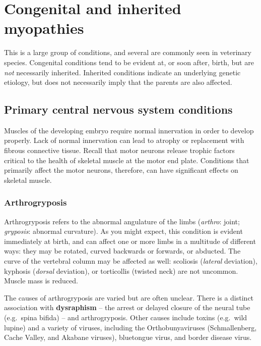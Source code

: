 \documentclass[openany]{book}
\begin{document}
\chapter{Congenital and inherited
myopathies}\label{congenital-and-inherited-myopathies}

This is a large group of conditions, and several are commonly seen in
veterinary species. Congenital conditions tend to be evident at, or soon
after, birth, but are \emph{not} necessarily inherited. Inherited
conditions indicate an underlying genetic etiology, but does not
necessarily imply that the parents are also affected.

\section{Primary central nervous system
conditions}\label{primary-central-nervous-system-conditions}

Muscles of the developing embryo require normal innervation in order to
develop properly. Lack of normal innervation can lead to atrophy or
replacement with fibrous connective tissue. Recall that motor neurons
release trophic factors critical to the health of skeletal muscle at the
motor end plate. Conditions that primarily affect the motor neurons,
therefore, can have significant effects on skeletal muscle.

\subsection{Arthrogryposis}\label{arthrogryposis}

Arthrogryposis refers to the abnormal angulature of the limbs
(\emph{arthro}: joint; \emph{gryposis}: abnormal curvature). As you
might expect, this condition is evident immediately at birth, and can
affect one or more limbs in a multitude of different ways: they may be
rotated, curved backwards or forwards, or abducted. The curve of the
vertebral column may be affected as well: scoliosis (\emph{lateral}
deviation), kyphosis (\emph{dorsal} deviation), or torticollis (twisted
neck) are not uncommon. Muscle mass is reduced.

The causes of arthrogryposis are varied but are often unclear. There is
a distinct association with \textbf{dysraphism} -- the arrest or delayed
closure of the neural tube (e.g.~spina bifida) -- and arthrogryposis.
Other causes include toxins (e.g.~wild lupine) and a variety of viruses,
including the Orthobunyaviruses (Schmallenberg, Cache Valley, and
Akabane viruses), bluetongue virus, and border disease virus.
\end{document}
